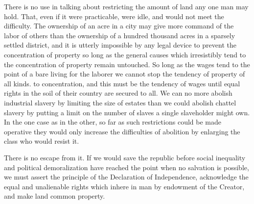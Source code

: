 \documentclass{book}
\begin{document}
There is no use in talking about restricting the amount of land any one man may hold. That, even if it were practicable, were idle, and would not meet the difficulty. The ownership of an acre in a city may give more command of the labor of others than the ownership of a hundred thousand acres in a sparsely settled district, and it is utterly impossible by any legal device to prevent the concentration of property so long as the general causes which irresistibly tend to the concentration of property remain untouched. So long as the wages tend to the point of a bare living for the laborer we cannot stop the tendency of property of all kinds. to concentration, and this must be the tendency of wages until equal rights in the soil of their country are secured to all. We can no more abolish industrial slavery by limiting the size of estates than we could abolish chattel slavery by putting a limit on the number of slaves a single slaveholder might own. In the one case as in the other, so far as such restrictions could be made operative they would only increase the difficulties of abolition by enlarging the class who would resist it.

There is no escape from it. If we would save the republic before social inequality and political demoralization have reached the point when no salvation is possible, we must assert the principle of the Declaration of Independence, acknowledge the equal and unalienable rights which inhere in man by endowment of the Creator, and make land common property.
\end{document}
